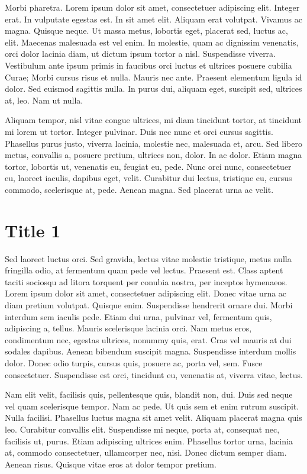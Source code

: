 \documentclass[a4paper,11pt,oneside]{report}
\begin{document}
Morbi pharetra. Lorem ipsum dolor sit amet, consectetuer adipiscing elit.
Integer erat. In vulputate egestas est. In sit amet elit. Aliquam erat volutpat.
Vivamus ac magna. Quisque neque. Ut massa metus, lobortis eget, placerat sed,
luctus ac, elit. Maecenas malesuada est vel enim. In molestie, quam ac dignissim
venenatis, orci dolor lacinia diam, ut dictum ipsum tortor a nisl. Suspendisse
viverra. Vestibulum ante ipsum primis in faucibus orci luctus et ultrices
posuere cubilia Curae; Morbi cursus risus et nulla. Mauris nec ante. Praesent
elementum ligula id dolor. Sed euismod sagittis nulla. In purus dui, aliquam
eget, suscipit sed, ultrices at, leo. Nam ut nulla.

Aliquam tempor, nisl vitae congue ultrices, mi diam tincidunt tortor, at
tincidunt mi lorem ut tortor. Integer pulvinar. Duis nec nunc et orci cursus
sagittis. Phasellus purus justo, viverra lacinia, molestie nec, malesuada et,
arcu. Sed libero metus, convallis a, posuere pretium, ultrices non, dolor. In ac
dolor. Etiam magna tortor, lobortis ut, venenatis eu, feugiat eu, pede. Nunc
orci nunc, consectetuer eu, laoreet iaculis, dapibus eget, velit. Curabitur dui
lectus, tristique eu, cursus commodo, scelerisque at, pede. Aenean magna. Sed
placerat urna ac velit.


\chapter{Title 1}
Sed laoreet luctus orci. Sed gravida, lectus vitae molestie tristique, metus
nulla fringilla odio, at fermentum quam pede vel lectus. Praesent est. Class
aptent taciti sociosqu ad litora torquent per conubia nostra, per inceptos
hymenaeos. Lorem ipsum dolor sit amet, consectetuer adipiscing elit. Donec vitae
urna ac diam pretium volutpat. Quisque enim. Suspendisse hendrerit ornare dui.
Morbi interdum sem iaculis pede. Etiam dui urna, pulvinar vel, fermentum quis,
adipiscing a, tellus. Mauris scelerisque lacinia orci. Nam metus eros,
condimentum nec, egestas ultrices, nonummy quis, erat. Cras vel mauris at dui
sodales dapibus. Aenean bibendum suscipit magna. Suspendisse interdum mollis
dolor. Donec odio turpis, cursus quis, posuere ac, porta vel, sem. Fusce
consectetuer. Suspendisse est orci, tincidunt eu, venenatis at, viverra vitae,
lectus.

Nam elit velit, facilisis quis, pellentesque quis, blandit non, dui. Duis sed
neque vel quam scelerisque tempor. Nam ac pede. Ut quis sem et enim rutrum
suscipit. Nulla facilisi. Phasellus luctus magna sit amet velit. Aliquam
placerat magna quis leo. Curabitur convallis elit. Suspendisse mi neque, porta
at, consequat nec, facilisis ut, purus. Etiam adipiscing ultrices enim.
Phasellus tortor urna, lacinia at, commodo consectetuer, ullamcorper nec, nisi.
Donec dictum semper diam. Aenean risus. Quisque vitae eros at dolor tempor
pretium.
\end{document}
